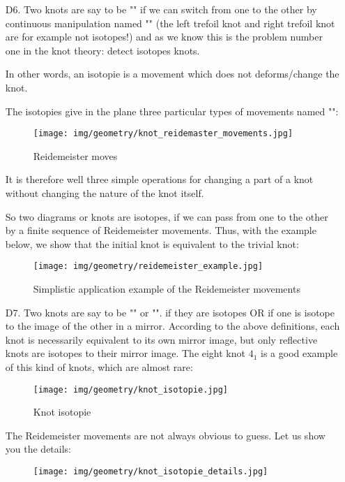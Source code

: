 {\begin{enumerate}
		\item[D6.] Two knots are say to be "" if we can switch from one to the other by continuous manipulation named "" (the left trefoil knot and right trefoil knot are for example not isotopes!) and as we know this is the problem number one in the knot theory: detect isotopes knots.
		
		In other words, an isotopie is a movement which does not deforms/change the knot.
		
		The isotopies give in the plane three particular types of movements named "":
		\begin{figure}[H]
			\centering
			\texttt{[image: img/geometry/knot\_reidemaster\_movements.jpg]}
			\caption{Reidemeister moves}
		\end{figure}
		It is therefore well three simple operations for changing a part of a knot without changing the nature of the knot itself.
		
		So two diagrams or knots are isotopes, if we can pass from one to the other by a finite sequence of Reidemeister movements. Thus, with the example below, we show that the initial knot is equivalent to the trivial knot:
		\begin{figure}[H]
			\centering
			\texttt{[image: img/geometry/reidemeister\_example.jpg]}
			\caption{Simplistic application example of the Reidemeister movements}
		\end{figure}
		
		\item[D7.] Two knots are say to be "" or "". if they are isotopes OR if one is isotope to the image of the other in a mirror. According to the above definitions, each knot is necessarily equivalent to its own mirror image, but only reflective knots are isotopes to their mirror image. The eight knot $4_1$ is a good example of this kind of knots, which are almost rare:
		\begin{figure}[H]
			\centering
			\texttt{[image: img/geometry/knot\_isotopie.jpg]}
			\caption{Knot isotopie}
		\end{figure}
		
		The Reidemeister movements are not always obvious to guess. Let us show you the details:
		\begin{figure}[H]
			\centering
			\texttt{[image: img/geometry/knot\_isotopie\_details.jpg]}
		\end{figure}
		

\end{enumerate}}
